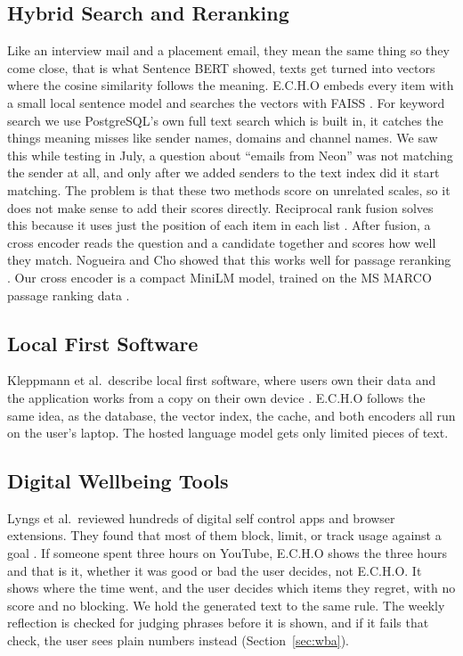 \documentclass[conference]{IEEEtran}
\begin{document}
\subsection{Hybrid Search and Reranking}
Like an interview mail and a placement email, they mean the same thing so they come close, that is what Sentence BERT \cite{b6} showed, texts get turned into vectors where the cosine similarity follows the meaning. E.C.H.O embeds every item with a small local sentence model \cite{b16} and searches the vectors with FAISS \cite{b8}. For keyword search we use PostgreSQL's own full text search which is built in, it catches the things meaning misses like sender names, domains and channel names. We saw this while testing in July, a question about ``emails from Neon'' was not matching the sender at all, and only after we added senders to the text index did it start matching. The problem is that these two methods score on unrelated scales, so it does not make sense to add their scores directly. Reciprocal rank fusion solves this because it uses just the position of each item in each list \cite{b9}. After fusion, a cross encoder reads the question and a candidate together and scores how well they match. Nogueira and Cho showed that this works well for passage reranking \cite{b10}. Our cross encoder is a compact MiniLM \cite{b7} model, trained on the MS MARCO passage ranking data \cite{b11}.

\subsection{Local First Software}
Kleppmann et al.\ describe local first software, where users own their data and the application works from a copy on their own device \cite{b12}. E.C.H.O follows the same idea, as the database, the vector index, the cache, and both encoders all run on the user's laptop. The hosted language model gets only limited pieces of text.

\subsection{Digital Wellbeing Tools}
Lyngs et al.\ reviewed hundreds of digital self control apps and browser extensions. They found that most of them block, limit, or track usage against a goal \cite{b14}. If someone spent three hours on YouTube, E.C.H.O shows the three hours and that is it, whether it was good or bad the user decides, not E.C.H.O. It shows where the time went, and the user decides which items they regret, with no score and no blocking. We hold the generated text to the same rule. The weekly reflection is checked for judging phrases before it is shown, and if it fails that check, the user sees plain numbers instead (Section~\ref{sec:wba}).
\end{document}
